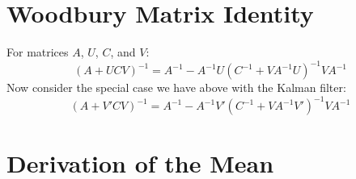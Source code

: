 \documentclass[a4paper,12pt]{article}
\begin{document}
\newpage
\appendix

\section{Woodbury Matrix Identity}

For matrices $A$, $U$, $C$, and $V$:
\begin{equation}
    (A+UCV)^{-1} = A^{-1} - A^{-1} U(C^{-1} + VA^{-1}U)^{-1}
	VA^{-1}
\end{equation}
Now consider the special case we have above with the
Kalman filter:
\begin{equation}
    \label{special}
    (A + V'CV)^{-1} = A^{-1} - A^{-1} V'(C^{-1} + VA^{-1}V')^{-1}
	VA^{-1}
\end{equation}

\section{Derivation of the Mean}
\end{document}
